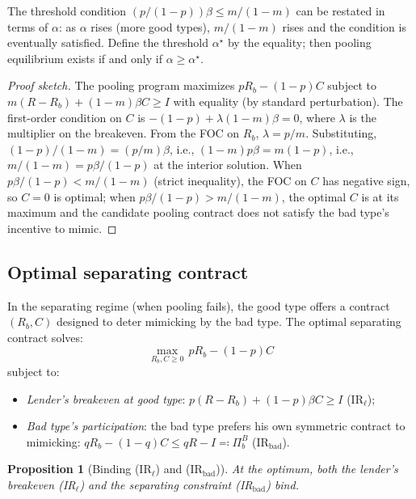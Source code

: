 \documentclass[11pt,a4paper,oneside]{book}
\def\leq{\leqslant}
\def\geq{\geqslant}
\theoremstyle{plain}
\newtheorem{proposition}[theorem]{Proposition}
\theoremstyle{definition}
\theoremstyle{remark}
\numberwithin{equation}{chapter}
\begin{document}
The threshold condition $(p/(1-p)) \beta \leq m/(1-m)$ can be restated in terms of $\alpha$: as $\alpha$ rises (more good types), $m/(1-m)$ rises and the condition is eventually satisfied.
Define the threshold $\alpha^\star$ by the equality; then pooling equilibrium exists if and only if $\alpha \geq \alpha^\star$.

\begin{proof}[Proof sketch]
The pooling program maximizes $p R_b - (1-p) C$ subject to $m(R - R_b) + (1 - m) \beta C \geq I$ with equality (by standard perturbation).
The first-order condition on $C$ is $-(1-p) + \lambda (1 - m) \beta = 0$, where $\lambda$ is the multiplier on the breakeven.
From the FOC on $R_b$, $\lambda = p/m$.
Substituting, $(1-p)/(1-m) = (p/m) \beta$, i.e., $(1-m) p \beta = m(1-p)$, i.e., $m/(1-m) = p\beta/(1-p)$ at the interior solution.
When $p\beta/(1-p) < m/(1-m)$ (strict inequality), the FOC on $C$ has negative sign, so $C = 0$ is optimal; when $p\beta/(1-p) > m/(1-m)$, the optimal $C$ is at its maximum and the candidate pooling contract does not satisfy the bad type's incentive to mimic.
\end{proof}

\subsection{Optimal separating contract}

In the separating regime (when pooling fails), the good type offers a contract $(R_b, C)$ designed to deter mimicking by the bad type.
The optimal separating contract solves:
\begin{equation*}
  \max_{R_b, C \geq 0} \, p R_b - (1 - p) C
\end{equation*}
subject to:
\begin{itemize}
  \item \emph{Lender's breakeven at good type}: $p(R - R_b) + (1 - p) \beta C \geq I$ (IR$_\ell$);
  \item \emph{Bad type's participation}: the bad type prefers his own symmetric contract to mimicking: $q R_b - (1 - q) C \leq q R - I \eqqcolon \Pi_b^{B}$ (IR$_{\text{bad}}$).
\end{itemize}

\begin{proposition}[Binding (IR$_\ell$) and (IR$_{\text{bad}}$)]\label{prop:diss-coll-sep-binding}
At the optimum, both the lender's breakeven (IR$_\ell$) and the separating constraint (IR$_{\text{bad}}$) bind.
\end{proposition}
\end{document}
